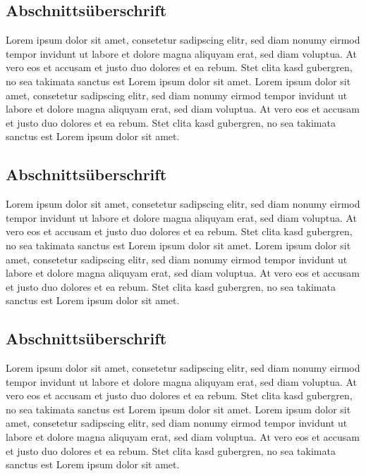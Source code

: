 \documentclass[12pt,oneside,a4paper,bibtotoc,liststotoc,pointlessnumbers]{scrartcl}
\begin{document}
\subsection{Abschnittsüberschrift}
Lorem ipsum dolor sit amet, consetetur sadipscing elitr, sed diam nonumy eirmod tempor invidunt ut labore et dolore magna aliquyam erat, sed diam voluptua. At vero eos et accusam et justo duo dolores et ea rebum. Stet clita kasd gubergren, no sea takimata sanctus est Lorem ipsum dolor sit amet. Lorem ipsum dolor sit amet, consetetur sadipscing elitr, sed diam nonumy eirmod tempor invidunt ut labore et dolore magna aliquyam erat, sed diam voluptua. At vero eos et accusam et justo duo dolores et ea rebum. Stet clita kasd gubergren, no sea takimata sanctus est Lorem ipsum dolor sit amet.
\subsection{Abschnittsüberschrift}
Lorem ipsum dolor sit amet, consetetur sadipscing elitr, sed diam nonumy eirmod tempor invidunt ut labore et dolore magna aliquyam erat, sed diam voluptua. At vero eos et accusam et justo duo dolores et ea rebum. Stet clita kasd gubergren, no sea takimata sanctus est Lorem ipsum dolor sit amet. Lorem ipsum dolor sit amet, consetetur sadipscing elitr, sed diam nonumy eirmod tempor invidunt ut labore et dolore magna aliquyam erat, sed diam voluptua. At vero eos et accusam et justo duo dolores et ea rebum. Stet clita kasd gubergren, no sea takimata sanctus est Lorem ipsum dolor sit amet.
\subsection{Abschnittsüberschrift}
Lorem ipsum dolor sit amet, consetetur sadipscing elitr, sed diam nonumy eirmod tempor invidunt ut labore et dolore magna aliquyam erat, sed diam voluptua. At vero eos et accusam et justo duo dolores et ea rebum. Stet clita kasd gubergren, no sea takimata sanctus est Lorem ipsum dolor sit amet. Lorem ipsum dolor sit amet, consetetur sadipscing elitr, sed diam nonumy eirmod tempor invidunt ut labore et dolore magna aliquyam erat, sed diam voluptua. At vero eos et accusam et justo duo dolores et ea rebum. Stet clita kasd gubergren, no sea takimata sanctus est Lorem ipsum dolor sit amet.

\newpage

\listoffigures

\newpage
\end{document}
